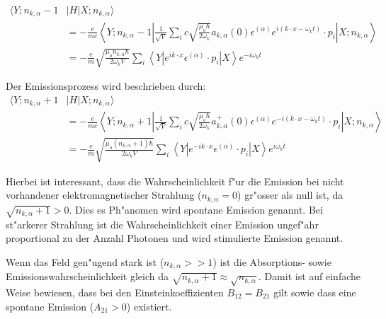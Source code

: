 \begin{equation}
\begin{split}
\langle Y; n_{k,\alpha} - 1 &| H | X; n_{k,\alpha} \rangle \\
&= -\frac{e}{mc} \left\langle Y; n_{k,\alpha} - 1 \left| 
\frac{1}{\sqrt{V}} \sum_i c \sqrt{\frac{\mu_o \hbar}{2 \omega_k}}a_{k,\alpha}(0) \epsilon^{(\alpha)} e^{i(k \cdot x-\omega_k t)} \cdot p_i 
\right| X; n_{k,\alpha} \right\rangle\\
&= -\frac{e}{m} \sqrt{\frac{\mu_o n_{k,\alpha} \hbar}{2 \omega_k V}} \sum_i \left\langle Y \left| 
e^{ik \cdot x} \epsilon^{(\alpha)} \cdot p_i 
\right| X \right\rangle e^{-i\omega_k t}
\end{split}
\end{equation}

Der Emissionsprozess wird beschrieben durch:
\begin{equation}
\begin{split}
\langle Y; n_{k,\alpha} + 1 &| H | X; n_{k,\alpha} \rangle \\
&= -\frac{e}{mc} \left\langle Y; n_{k,\alpha} + 1 \left| 
\frac{1}{\sqrt{V}} \sum_i c \sqrt{\frac{\mu_o \hbar}{2 \omega_k}}a^+_{k,\alpha}(0) \epsilon^{(\alpha)} e^{-i(k \cdot x-\omega_k t)} \cdot p_i 
\right| X; n_{k,\alpha} \right\rangle\\
&= -\frac{e}{m} \sqrt{\frac{ \mu_o (n_{k,\alpha}+1) \hbar}{2 \omega_k V}} \sum_i \left\langle Y \left| 
e^{-ik \cdot x} \epsilon^{(\alpha)} \cdot p_i 
\right| X \right\rangle e^{i\omega_k t}
\end{split}
\end{equation}

Hierbei ist interessant, dass die Wahrscheinlichkeit f"ur die Emission bei nicht vorhandener elektromagnetischer Strahlung ($n_{k,\alpha} = 0$) gr"osser als null ist, da $\sqrt{n_{k,\alpha}+1} > 0$. Dies es Ph"anomen wird spontane Emission genannt. Bei st"arkerer Strahlung ist die Wahrscheinlichkeit einer Emission ungef"ahr proportional zu der Anzahl Photonen und wird stimulierte Emission genannt.

Wenn das Feld gen"ugend stark ist ($n_{k,\alpha} >> 1$) ist die Absorptions- sowie Emissionswahrscheinlichkeit gleich da $\sqrt{n_{k,\alpha}+1} \approx \sqrt{n_{k,\alpha}}$. Damit ist auf einfache Weise bewiesen, dass bei den Einsteinkoeffizienten \cite{fq:einstein_koeff} $B_{12} = B_{21}$ gilt sowie dass eine spontane Emission ($A_{21} > 0$) existiert.